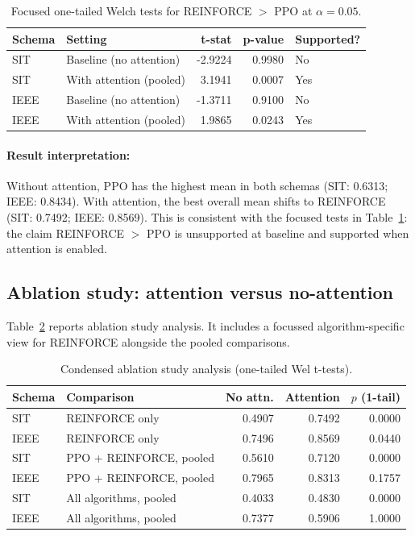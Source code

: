 \documentclass[sn-basic]{sn-jnl}%
\begin{document}
\begin{table}[htbp]
	\centering
	\caption{Focused one-tailed Welch tests for \textsc{REINFORCE} $>$ \textsc{PPO} at $\alpha=0.05$.}
	\label{tab:rf_vs_ppo_tests}
	\begin{tabular}{l l r r l}
	\toprule
	\textbf{Schema} & \textbf{Setting} & \textbf{t-stat} & \textbf{p-value} & \textbf{Supported?}\\
	\midrule
	SIT & Baseline (no attention) & -2.9224 & 0.9980 & No\\
	SIT & With attention (pooled) & 3.1941 & 0.0007 & Yes\\
	IEEE & Baseline (no attention) & -1.3711 & 0.9100 & No\\
	IEEE & With attention (pooled) & 1.9865 & 0.0243 & Yes\\
	\bottomrule
	\end{tabular}
\end{table}

\paragraph{Result interpretation:}
Without attention, \textsc{PPO} has the highest mean in both schemas (SIT: 0.6313; IEEE: 0.8434). With attention, the best overall mean shifts to \textsc{REINFORCE} (SIT: 0.7492; IEEE: 0.8569). This is consistent with the focused tests in Table~\ref{tab:rf_vs_ppo_tests}: the claim \textsc{REINFORCE} $>$ \textsc{PPO} is unsupported at baseline and supported when attention is enabled.

\subsection{Ablation study: attention versus no-attention} \label{sec:ablation_results} %

Table~\ref{tab:ablation_condensed} reports ablation study analysis. It includes a focussed algorithm-specific view for \textsc{REINFORCE} alongside the pooled comparisons.

\begin{table}[htbp]
	\centering
	\caption{Condensed ablation study analysis (one-tailed Wel t-tests).}
	\label{tab:ablation_condensed}
	\begin{tabular}{l l r r r}
		\toprule
		\textbf{Schema} & \textbf{Comparison} & \textbf{No attn.} & \textbf{Attention} & \textbf{$p$ (1-tail)}\\
		\midrule
		SIT & \textsc{REINFORCE} only & 0.4907 & 0.7492 & 0.0000\\
		IEEE & \textsc{REINFORCE} only & 0.7496 & 0.8569 & 0.0440\\
		SIT & PPO + \textsc{REINFORCE}, pooled & 0.5610 & 0.7120 & 0.0000\\
		IEEE & PPO + \textsc{REINFORCE}, pooled & 0.7965 & 0.8313 & 0.1757\\
		SIT & All algorithms, pooled & 0.4033 & 0.4830 & 0.0000\\
		IEEE & All algorithms, pooled & 0.7377 & 0.5906 & 1.0000\\
		\bottomrule
	\end{tabular}
\end{table}
\end{document}
